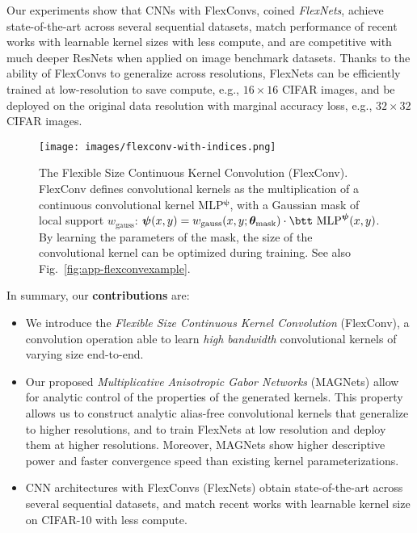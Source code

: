 \documentclass{article} \usepackage{iclr2022_conference,times}
\def\bpsi{{\boldsymbol{\psi}}}
\newcommand{\mlp}{{\btt MLP}}
\newcommand{\mlppsi}{\mlp$^{\bpsi}$}
\begin{document}
Our experiments show that CNNs with FlexConvs, coined \textit{FlexNets}, achieve state-of-the-art across several sequential datasets, match performance of recent works with learnable kernel sizes with less compute, and are competitive with much deeper ResNets \citep{he2016deep} when applied on image benchmark datasets. Thanks to the ability of FlexConvs to generalize across resolutions, FlexNets can be efficiently trained at low-resolution to save compute, e.g., $16\times16$ CIFAR images, and be deployed on the original data resolution with marginal accuracy loss, e.g., $32\times32$ CIFAR images.\begin{figure}[t]
    \centering
\texttt{[image: images/flexconv-with-indices.png]}
    \vspace{-3mm}
    \caption{The Flexible Size Continuous Kernel Convolution (FlexConv). FlexConv defines convolutional kernels as the multiplication of a continuous convolutional kernel \mlppsi, with a Gaussian mask of local support $w_{\textrm{gauss}}$: $\boldsymbol{\psi}(x, y) = w_{\textrm{gauss}}( x, y ; \boldsymbol{\theta}_{\mathrm{mask}}) \cdot \boldsymbol{\text{\btt MLP}^{\psi}}(x, y)$. By learning the parameters of the mask, the size of the convolutional kernel can be optimized during training. See also Fig.~\ref{fig:app-flexconvexample}.
    \vspace{-2mm}}
    \label{fig:flexconv}
\end{figure}

In summary, our \textbf{contributions} are:
\begin{itemize}[topsep=0pt, leftmargin=*]
    \item We introduce the \textit{Flexible Size Continuous Kernel Convolution} (FlexConv), a convolution operation able to learn \emph{high bandwidth} convolutional kernels of varying size end-to-end. 
    \item Our proposed \textit{Multiplicative Anisotropic Gabor Networks} (MAGNets) allow for analytic control of the properties of the generated kernels. This property allows us to construct analytic alias-free convolutional kernels that generalize to higher resolutions, and to train FlexNets at low resolution and deploy them at higher resolutions. Moreover, MAGNets show higher descriptive power and faster convergence speed than existing kernel parameterizations.
    \item CNN architectures with FlexConvs (FlexNets) obtain state-of-the-art across several sequential datasets, and match recent works with learnable kernel size on CIFAR-10 with less compute.
\end{itemize}
\vspace{-2mm}
\end{document}
